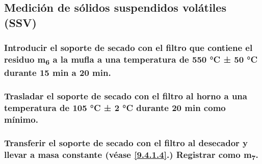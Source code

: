 \documentclass[spanish,12pt,letterpaper,titlepage]{article}
\theoremstyle{definition}
\begin{document}
	\subsection{Medición de sólidos suspendidos volátiles (SSV)}\label{9.6.2}
	\subsubsection{Introducir el soporte de secado con el filtro que contiene el residuo m\textsubscript{6} a la mufla a una temperatura de 550 °C ± 50 °C durante 15 min a 20 min.}\label{9.6.2.1}
	\subsubsection{Trasladar el soporte de secado con el filtro al horno a una temperatura de 105 °C ± 2 °C durante 20 min como mínimo.}\label{9.6.2.2}
	\subsubsection{Transferir el soporte de secado con el filtro al desecador y llevar a masa constante (véase \ref{9.4.1.4}.) Registrar como m\textsubscript{7}.}\label{9.6.2.3}
\end{document}
